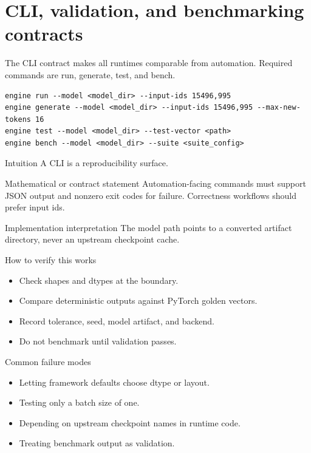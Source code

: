 \chapter{CLI, validation, and benchmarking contracts}
\label{ch:cli-contracts}
The CLI contract makes all runtimes comparable from automation. Required commands are run, generate, test, and bench.


\begin{lstlisting}[caption={Common CLI operations.}]
engine run --model <model_dir> --input-ids 15496,995
engine generate --model <model_dir> --input-ids 15496,995 --max-new-tokens 16
engine test --model <model_dir> --test-vector <path>
engine bench --model <model_dir> --suite <suite_config>
\end{lstlisting}


\begin{intuitionbox}{Intuition}
A CLI is a reproducibility surface.
\end{intuitionbox}

\begin{definitionbox}{Mathematical or contract statement}
Automation-facing commands must support JSON output and nonzero exit codes for failure. Correctness workflows should prefer input ids.
\end{definitionbox}

\begin{implementationbox}{Implementation interpretation}
The model path points to a converted artifact directory, never an upstream checkpoint cache.
\end{implementationbox}

\begin{verificationbox}{How to verify this works}
\begin{itemize}
\item Check shapes and dtypes at the boundary.
\item Compare deterministic outputs against PyTorch golden vectors.
\item Record tolerance, seed, model artifact, and backend.
\item Do not benchmark until validation passes.
\end{itemize}
\end{verificationbox}

\begin{warningbox}{Common failure modes}
\begin{itemize}
\item Letting framework defaults choose dtype or layout.
\item Testing only a batch size of one.
\item Depending on upstream checkpoint names in runtime code.
\item Treating benchmark output as validation.
\end{itemize}
\end{warningbox}

